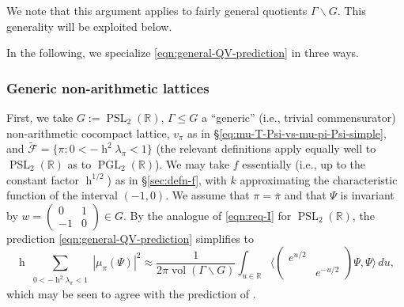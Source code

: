 \documentclass[reqno,10pt]{amsart}
\theoremstyle{plain} %
\theoremstyle{definition}
\theoremstyle{plain} %
\theoremstyle{remark}
\theoremstyle{itplain} %
\theoremstyle{remark} %
\renewcommand{\leq}{\leqslant}
\numberwithin{equation}{section}
\def\PGL{\operatorname{PGL}}
\DeclareMathOperator{\PSL}{PSL}
\DeclareMathOperator{\vol}{vol}
\DeclareMathOperator{\h}{h}
\begin{document}
We note that this argument applies to fairly general quotients $\Gamma \backslash G$.  This generality will be exploited below.


In the following, we specialize \eqref{eqn:general-QV-prediction} in three ways.

\subsubsection{Generic non-arithmetic lattices}\label{sec:35ac3e57ae}
First, we take $G := \PSL_2(\mathbb{R})$, $\Gamma \leq G$ a ``generic'' (i.e., trivial commensurator) non-arithmetic cocompact lattice, $v_\pi$ as in \S\ref{eq:mu-T-Psi-vs-mu-pi-Psi-simple}, and $\tilde{\mathcal{F}} = \{\pi : 0 < - \h^2 \lambda_\pi < 1\}$ (the relevant definitions apply equally well to $\PSL_2(\mathbb{R})$ as to $\PGL_2(\mathbb{R})$).  We may take $f$ essentially (i.e., up to the constant factor $\h^{1/2}$) as in \S\ref{sec:defn-f}, with $k$ approximating the characteristic function of the interval $(-1,0)$.  We assume that $\pi = \overline{\pi}$ and that $\Psi$ is invariant by $w = \begin{pmatrix} 0 & 1 \\ -1 & 0 \end{pmatrix} \in G$.  By the analogue of \eqref{eqn:req-I} for $\PSL_2(\mathbb{R})$, the prediction \eqref{eqn:general-QV-prediction} simplifies to
\begin{equation*}
  \h
  \sum_{
    \substack{
      0 < -\h^2 \lambda_\pi < 1
    }
  }
  | \mu_\pi(\Psi) |^2
  \approx 
  \frac{1}{2 \pi \vol(\Gamma \backslash G)}
  \int_{u \in \mathbb{R}}
  \langle \begin{pmatrix}
    e^{u/2} &  \\
    & e^{-u/2}
  \end{pmatrix} \Psi, \Psi \rangle \, d u,
\end{equation*}
which may be seen to agree with the prediction of \cite{MR848319}.
\end{document}
